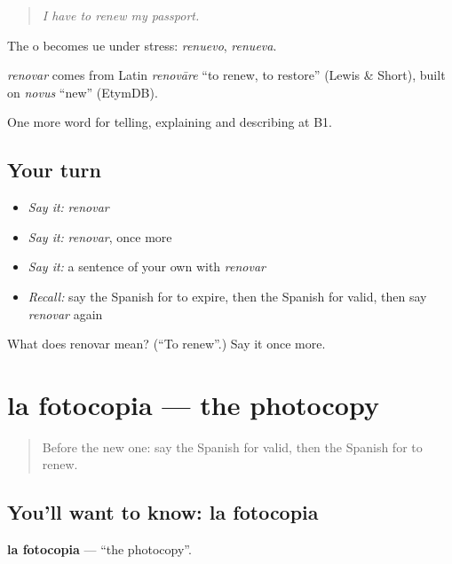 \begin{quote}
\emph{I have to renew my passport.}
\end{quote}

The o becomes ue under stress: \emph{renuevo}, \emph{renueva}.

\begin{cousinweb}
\emph{renovar} comes from Latin \emph{renovāre} \textquotedblleft{}to renew, to restore\textquotedblright{} (Lewis \& Short), built on \emph{novus} \textquotedblleft{}new\textquotedblright{} (EtymDB).
\end{cousinweb}

\begin{grammarlens}[title={What you've built}]
One more word for telling, explaining and describing at B1.
\end{grammarlens}

\subsection*{Your turn}
\begin{itemize}
\raggedright
  \item \emph{Say it:} \emph{renovar}
  \item \emph{Say it:} \emph{renovar}, once more
  \item \emph{Say it:} a sentence of your own with \emph{renovar}
  \item \emph{Recall:} say the Spanish for to expire, then the Spanish for valid, then say \emph{renovar} again
\end{itemize}

\begin{tcolorbox}[breakable,colback=teal!4,colframe=teal!35!black,title={Before you move on}]
What does renovar mean? (\textquotedblleft{}To renew\textquotedblright{}.) Say it once more.
\end{tcolorbox}
\section[la fotocopia]{la fotocopia — the photocopy}

\label{lesson:ES-C657-fotocopia}



\begin{quote}
Before the new one: say the Spanish for valid, then the Spanish for to renew.
\end{quote}

\subsection*{You'll want to know: la fotocopia}
\textbf{la fotocopia} — \textquotedblleft{}the photocopy\textquotedblright{}.

